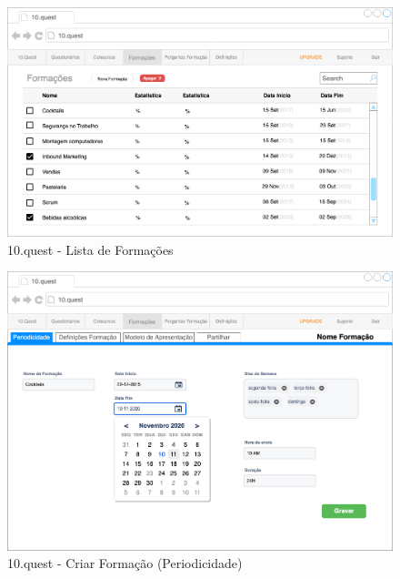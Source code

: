 \begin{figure}[ht!]
	\begin{center}
		\includegraphics[width=1\textwidth]{img/prototipos/8.png}
		\caption{10.quest - Lista de Formações}
		\label{10q-}
	\end{center}
\end{figure}

\begin{figure}[ht!]
	\begin{center}
		\includegraphics[width=1\textwidth]{img/prototipos/9.png}
		\caption{10.quest - Criar Formação (Periodicidade)}
		\label{10q-}
	\end{center}
\end{figure}

